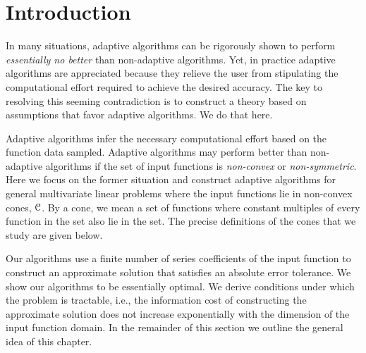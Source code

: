 \documentclass[USenglish]{article}
\theoremstyle{dgthm}
\theoremstyle{dgthm}
\theoremstyle{dgthm}
\theoremstyle{dgthm}
\theoremstyle{dgdef}
\theoremstyle{definition}
\begin{document}
\section{Introduction} 

In many situations, adaptive algorithms can be rigorously shown to perform \emph{essentially no better} than non-adaptive algorithms.  Yet, in practice adaptive algorithms are appreciated because they relieve the user from stipulating the computational effort required to achieve the desired accuracy.  The key to resolving this seeming contradiction is to construct a theory based on assumptions that favor adaptive algorithms. We do that here.

Adaptive algorithms infer the necessary computational effort based on the function data sampled.  Adaptive algorithms may perform better than non-adaptive algorithms if the set of input functions is \emph{non-convex} or \emph{non-symmetric}. Here we focus on the former situation and construct adaptive algorithms for general multivariate linear problems where the input functions lie in non-convex cones, ${\mathcal{C}}$. By a cone, we mean a set of functions where constant multiples of every function in the set also lie in the set. The precise definitions of the cones that we study are given below.

Our algorithms use a finite number of series coefficients of the input function to construct an approximate solution that satisfies an absolute error tolerance.  We show our algorithms to be essentially optimal.  We derive conditions under which the problem is tractable, i.e., the information cost of constructing the approximate solution does not increase exponentially with the dimension of the input function domain.  In the remainder of this section we outline the general idea of this chapter. 
\end{document}
